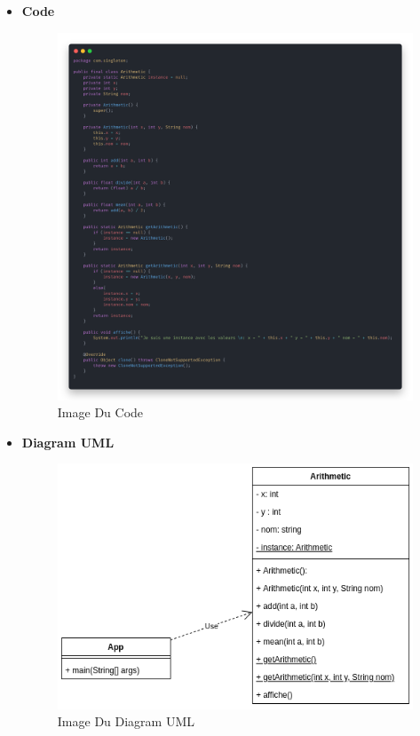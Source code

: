 \begin{itemize}
\item
  \textbf{Code}

  \begin{figure}
  \centering
  \includegraphics{arithmetic.png}
  \caption{Image Du Code}
  \end{figure}
\item
  \textbf{Diagram UML}

  \begin{figure}
  \centering
  \includegraphics{diagram.png}
  \caption{Image Du Diagram UML}
  \end{figure}
\end{itemize}
